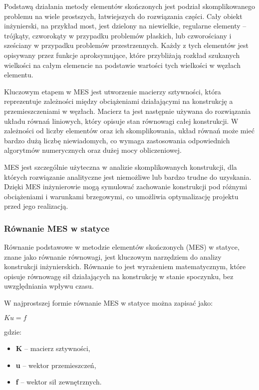 Podstawą działania metody elementów skończonych jest podział skomplikowanego problemu na wiele prostszych, łatwiejszych do rozwiązania części.
Cały obiekt inżynierski, na przykład most, jest dzielony na niewielkie, regularne elementy – trójkąty, czworokąty w przypadku problemów płaskich, lub czworościany i sześciany w przypadku problemów przestrzennych.
Każdy z tych elementów jest opisywany przez funkcje aproksymujące, które przybliżają rozkład szukanych wielkości na całym elemencie na podstawie wartości tych wielkości w węzłach elementu.

Kluczowym etapem w MES jest utworzenie macierzy sztywności, która reprezentuje zależności między obciążeniami działającymi na konstrukcję a przemieszczeniami w węzłach.
Macierz ta jest następnie używana do rozwiązania układu równań liniowych, który opisuje stan równowagi całej konstrukcji.
W zależności od liczby elementów oraz ich skomplikowania, układ równań może mieć bardzo dużą liczbę niewiadomych, co wymaga zastosowania odpowiednich algorytmów numerycznych oraz dużej mocy obliczeniowej.

MES jest szczególnie użyteczna w analizie skomplikowanych konstrukcji, dla których rozwiązanie analityczne jest niemożliwe lub bardzo trudne do uzyskania.
Dzięki MES inżynierowie mogą symulować zachowanie konstrukcji pod różnymi obciążeniami i warunkami brzegowymi, co umożliwia optymalizację projektu przed jego realizacją.

\subsubsection*{Równanie MES w statyce}

Równanie podstawowe w metodzie elementów skończonych (MES) w statyce, znane jako równanie równowagi, jest kluczowym narzędziem do analizy konstrukcji inżynierskich. Równanie to jest wyrażeniem matematycznym, które opisuje równowagę sił działających na konstrukcję w stanie spoczynku, bez uwzględniania wpływu czasu.

W najprostszej formie równanie MES w statyce można zapisać jako:

$Ku=f$

gdzie:
\begin{itemize}
    \item \textbf{K} – macierz sztywności,
    \item \textbf{u} – wektor przemieszczeń,
    \item \textbf{f} – wektor sił zewnętrznych.
\end{itemize}

